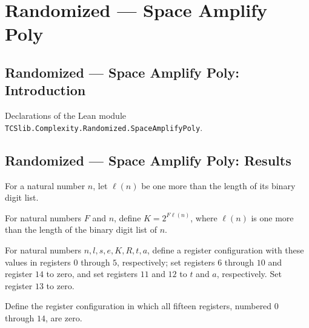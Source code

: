 \section{Randomized --- Space Amplify Poly}
\subsection*{Randomized --- Space Amplify Poly: Introduction}

Declarations of the Lean module \texttt{TCSlib.Complexity.Randomized.SpaceAmplifyPoly}.

\subsection*{Randomized --- Space Amplify Poly: Results}

\begin{definition}
\label{Randomized.PolyAmp.ell}
\leanok
For a natural number $n$, let $\ell(n)$ be one more than the length of its binary digit
list.
\end{definition}

\begin{definition}
\label{Randomized.PolyAmp.bigK}
\leanok
{}
For natural numbers $F$ and $n$, define $K=2^{F\ell(n)}$, where $\ell(n)$ is one more
than the length of the binary digit list of $n$.
\end{definition}

\begin{definition}
\label{Randomized.PolyAmp.sreg}
\leanok
{}
For natural numbers $n,l,s,e,K,R,t,a$, define a register configuration with these values
in registers $0$ through $5$, respectively; set registers $6$ through $10$ and register
$14$ to zero, and set registers $11$ and $12$ to $t$ and $a$, respectively. Set register
$13$ to zero.
\end{definition}

\begin{definition}
\label{Randomized.PolyAmp.reg0}
\leanok
{}
Define the register configuration in which all fifteen registers, numbered $0$ through
$14$, are zero.
\end{definition}

